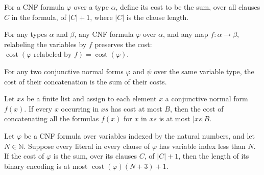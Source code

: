 \begin{definition}
\label{Complexity.FormulaKit.cost}
\leanok
For a CNF formula $\varphi$ over a type $\alpha$, define its cost to be the sum, over
all clauses $C$ in the formula, of $|C|+1$, where $|C|$ is the clause length.
\end{definition}

\begin{theorem}
\label{Complexity.FormulaKit.cost_relabel}
\leanok
{}
For any types $\alpha$ and $\beta$, any CNF formula $\varphi$ over $\alpha$, and any map
$f: \alpha \to \beta$, relabeling the variables by $f$ preserves the cost:
$\operatorname{cost}(\varphi\text{ relabeled by }f)=\operatorname{cost}(\varphi)$.
\end{theorem}

\begin{theorem}
\label{Complexity.FormulaKit.cost_append}
\leanok
{}
For any two conjunctive normal forms $\varphi$ and $\psi$ over the same variable type,
the cost of their concatenation is the sum of their costs.
\end{theorem}

\begin{theorem}
\label{Complexity.FormulaKit.cost_flatMap_le}
\leanok
{}
Let $xs$ be a finite list and assign to each element $x$ a conjunctive normal form
$f(x)$. If every $x$ occurring in $xs$ has cost at most $B$, then the cost of
concatenating all the formulas $f(x)$ for $x$ in $xs$ is at most $|xs|B$.
\end{theorem}

\begin{theorem}
\label{Complexity.FormulaKit.serialize_length_le}
\leanok
{}
Let $\varphi$ be a CNF formula over variables indexed by the natural numbers, and let
$N\in\mathbb N$. Suppose every literal in every clause of $\varphi$ has variable index
less than $N$. If the cost of $\varphi$ is the sum, over its clauses $C$, of $|C|+1$,
then the length of its binary encoding is at most $\operatorname{cost}(\varphi)(N+3)+1$.
\end{theorem}

